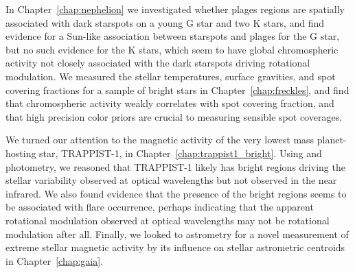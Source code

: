 In Chapter~\ref{chap:nephelion} we investigated whether plages regions are spatially associated with dark starspots on a young G star and two K stars, and find evidence for a Sun-like association between starspots and plages for the G star, but no such evidence for the K stars, which seem to have global chromospheric activity not closely associated with the dark starspots driving rotational modulation. We measured the stellar temperatures, surface gravities, and spot covering fractions for a sample of bright stars in Chapter~\ref{chap:freckles}, and find that chromospheric activity weakly correlates with spot covering fraction, and that high precision color priors are crucial to measuring sensible spot coverages. 

We turned our attention to the magnetic activity of the very lowest mass planet-hosting star, TRAPPIST-1, in Chapter~\ref{chap:trappist1_bright}. Using \kepler and \spitzer photometry, we reasoned that TRAPPIST-1 likely has bright regions driving the stellar variability observed at optical wavelengths but not observed in the near infrared. We also found evidence that the presence of the bright regions seems to be associated with flare occurrence, perhaps indicating that the apparent rotational modulation observed at optical wavelengths may not be rotational modulation after all. Finally, we looked to astrometry for a novel measurement of extreme stellar magnetic activity by its influence on stellar astrometric centroids in Chapter~\ref{chap:gaia}.  


